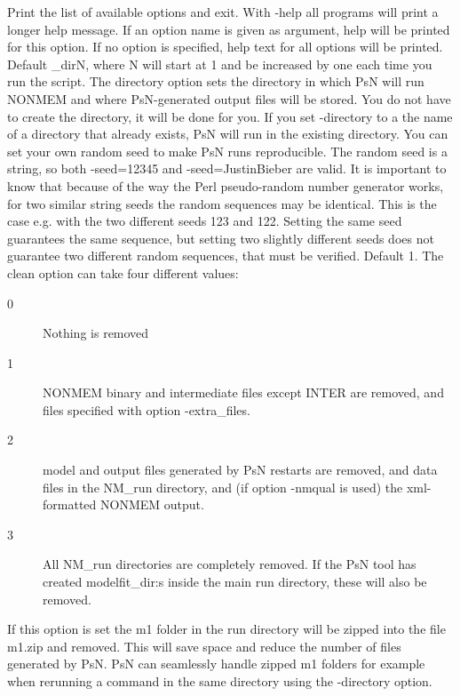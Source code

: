 \begin{optionlist}
Print the list of available options and exit. 
\nextopt
{}
With -help all programs will print a longer help message. 
If an option name is given as argument, help will be printed for this option. 
If no option is specified, help text for all options will be printed. 
\nextopt
{}
Default \guidetoolname\_dirN,
where N will start at 1 and
be increased by one each time you run the script. The directory option sets the directory in which PsN 
will run NONMEM and where PsN-generated output files will be stored. 
You do not have to create the directory,  it will be done for you. If you set
-directory to a the name of a directory that already exists, PsN will run in the existing directory.
\nextopt
{}
You can set your own random seed to make PsN runs reproducible.
The random seed is a string, so both -seed=12345 and -seed=JustinBieber are valid.
It is important to know that because of the way the Perl pseudo-random
number generator works, for two similar string seeds the random sequences may be identical. 
This is the case e.g. with the two different seeds 123 and 122. 
Setting the same seed guarantees the same sequence, but setting two slightly different 
seeds does not guarantee two different random sequences, that must be verified.
\nextopt
{}
Default 1. The clean option can take four different values:  
\begin{description}
\item[0] Nothing is removed 
\item[1] NONMEM binary and intermediate files except INTER are removed, and files specified with option -extra\_files. 
\item[2] model and output files generated by PsN restarts are removed, and data files in the NM\_run directory, and (if option -nmqual is used) the xml-formatted NONMEM output. 
\item[3] All NM\_run directories are completely removed. If the PsN tool has created modelfit\_dir:s inside the main run directory, these  will also be removed. 
\end{description}
\nextopt
{}
If this option is set the m1 folder in the run directory will be zipped into the file m1.zip and removed. This will save space and reduce the number of files generated by PsN. PsN can seamlessly handle zipped m1 folders for example when rerunning a command in the same directory using the -directory option.
\nextopt
{}

\end{optionlist}
